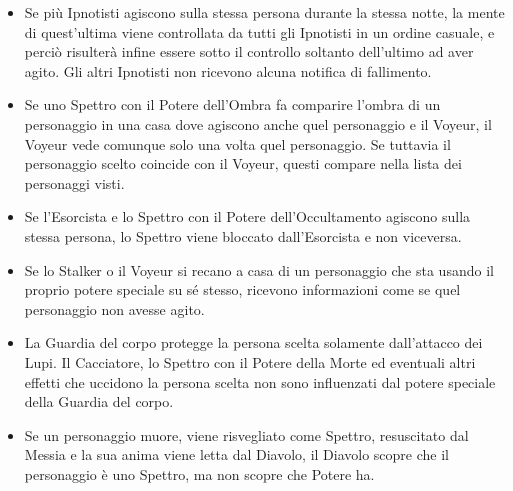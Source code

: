 \documentclass[a4paper,10pt]{article}
\begin{document}
\begin{itemize}
 \item Se più Ipnotisti agiscono sulla stessa persona durante la stessa notte, la mente di quest'ultima viene controllata da tutti gli Ipnotisti in un ordine casuale, e perciò risulterà infine essere sotto il controllo soltanto dell'ultimo ad aver agito. Gli altri Ipnotisti non ricevono alcuna notifica di fallimento.
 
 \item Se uno Spettro con il Potere dell'Ombra fa comparire l'ombra di un personaggio in una casa dove agiscono anche quel personaggio e il Voyeur, il Voyeur vede comunque solo una volta quel personaggio. Se tuttavia il personaggio scelto coincide con il Voyeur, questi compare nella lista dei personaggi visti.

 \item Se l'Esorcista e lo Spettro con il Potere dell'Occultamento agiscono sulla stessa persona, lo Spettro viene bloccato dall'Esorcista e non viceversa.
 
 \item Se lo Stalker o il Voyeur si recano a casa di un personaggio che sta usando il proprio potere speciale su sé stesso, ricevono informazioni come se quel personaggio non avesse agito.
 
 \item La Guardia del corpo protegge la persona scelta solamente dall'attacco dei Lupi. Il Cacciatore, lo Spettro con il Potere della Morte ed eventuali altri effetti che uccidono la persona scelta non sono influenzati dal potere speciale della Guardia del corpo.
 
 \item Se un personaggio muore, viene risvegliato come Spettro, resuscitato dal Messia e la sua anima viene letta dal Diavolo, il Diavolo scopre che il personaggio è uno Spettro, ma non scopre che Potere ha. 
\end{itemize}
\end{document}
